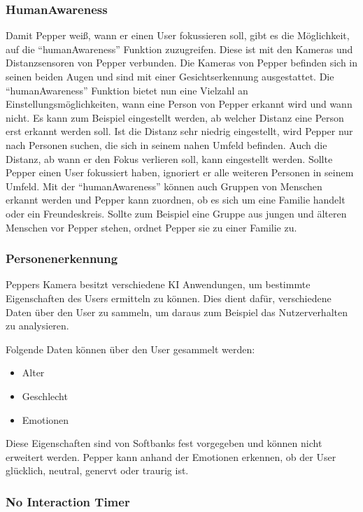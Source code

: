 \subsubsection{HumanAwareness}

Damit Pepper weiß, wann er einen User fokussieren soll, gibt es die Möglichkeit, auf die ``humanAwareness'' Funktion zuzugreifen. 
Diese ist mit den Kameras und Distanzsensoren von Pepper verbunden. Die Kameras von Pepper befinden sich in seinen beiden Augen und sind mit 
einer Gesichtserkennung ausgestattet. Die ``humanAwareness'' Funktion bietet nun eine Vielzahl an Einstellungsmöglichkeiten, wann eine 
Person von Pepper erkannt wird und wann nicht. Es kann zum Beispiel eingestellt werden, ab welcher Distanz eine Person erst erkannt werden soll. 
Ist die Distanz sehr niedrig eingestellt, wird Pepper nur nach Personen suchen, die sich in seinem nahen Umfeld befinden. Auch die Distanz, 
ab wann er den Fokus verlieren soll, kann eingestellt werden. 
Sollte Pepper einen User fokussiert haben, ignoriert er alle weiteren Personen in seinem Umfeld. Mit der ``humanAwareness'' können auch 
Gruppen von Menschen erkannt werden und Pepper kann zuordnen, ob es sich um eine Familie handelt oder ein Freundeskreis. Sollte zum Beispiel eine 
Gruppe aus jungen und älteren Menschen vor Pepper stehen, ordnet Pepper sie zu einer Familie zu.

\subsubsection{Personenerkennung}

Peppers Kamera besitzt verschiedene KI Anwendungen, um bestimmte Eigenschaften des Users ermitteln zu können. Dies dient dafür, verschiedene 
Daten über den User zu sammeln, um daraus zum Beispiel das Nutzerverhalten zu analysieren.

Folgende Daten können über den User gesammelt werden:
\begin{itemize}
\item Alter
\item Geschlecht
\item Emotionen
\end{itemize}

Diese Eigenschaften sind von Softbanks fest vorgegeben und können nicht erweitert werden. Pepper kann anhand der Emotionen erkennen, ob der User 
glücklich, neutral, genervt oder traurig ist.

\subsubsection{No Interaction Timer}

